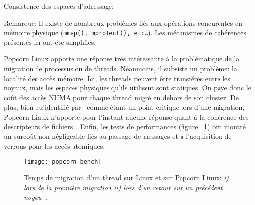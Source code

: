 \begin{paragraph}{Consistence des espaces d'adressage:}
        \begin{paragraph}{Remarque:}
          Il existe de nombreux problèmes liés aux opérations concurentes en
          mémoire physique (\texttt{mmap(), mprotect(), etc\ldots}). Les
          mécanismes de cohérences présentés ici ont été simplifiés.\\
        \end{paragraph}

      \end{paragraph}

      Popcorn Linux apporte une réponse très intéressante à la problématique de
      la migration de processus ou de threads. Néanmoins, il subsiste un
      problème: la localité des accès mémoire. Ici, les threads peuvent être
      transférés entre les noyaux, mais les espaces physiques qu'ils utilisent
      sont statiques. On paye donc le coût des accès NUMA pour chaque thread
      migré en dehors de son cluster. De plus, bien qu'identifié
      par~\citeauthor{katz2013popcorn} comme étant un point critique lors d'une
      migration, Popcorn Linux n'apporte pour l'instant aucune réponse quant à
      la cohérence des descripteurs de fichiers~\citep[page
        4]{katz2013popcorn}. Enfin, les tests de performances (figure
      ~\ref{fig:popcorn-bench}) ont montré un surcoût non négligeable liés au
      passage de messages et à l'acquisition de verrous pour les accès
      atomiques.

      \begin{figure}[ht]
        \centering \texttt{[image: popcorn-bench]}
        \caption{Temps de migration d'un thread sur Linux et sur Popcorn Linux:
          \itshape i) \upshape lors de la première migration \itshape ii)
          \upshape lors d'un retour sur un précédent
          noyau~\citep{katz2013popcorn}.}
        \label{fig:popcorn-bench}
      \end{figure}
